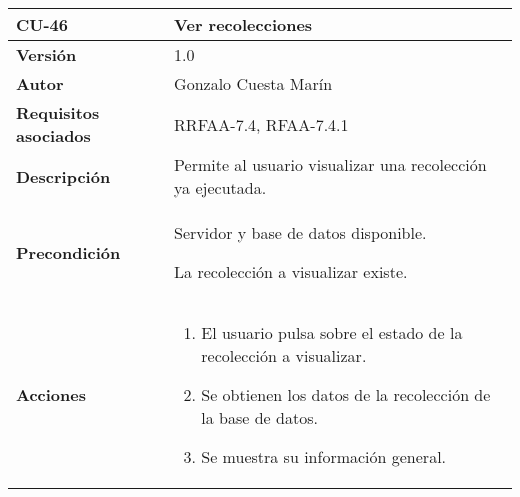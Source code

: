 \begin{longtable}[]{@{}ll@{}}
\toprule
\begin{minipage}[b]{0.25\columnwidth}\raggedright
\textbf{CU-46}\strut
\end{minipage} & \begin{minipage}[b]{0.69\columnwidth}\raggedright
\textbf{Ver recolecciones}\strut
\end{minipage}\tabularnewline
\midrule
\endhead
\begin{minipage}[t]{0.25\columnwidth}\raggedright
\textbf{Versión}\strut
\end{minipage} & \begin{minipage}[t]{0.69\columnwidth}\raggedright
1.0\strut
\end{minipage}\tabularnewline
\begin{minipage}[t]{0.25\columnwidth}\raggedright
\textbf{Autor}\strut
\end{minipage} & \begin{minipage}[t]{0.69\columnwidth}\raggedright
Gonzalo Cuesta Marín\strut
\end{minipage}\tabularnewline
\begin{minipage}[t]{0.25\columnwidth}\raggedright
\textbf{Requisitos asociados}\strut
\end{minipage} & \begin{minipage}[t]{0.69\columnwidth}\raggedright
RRFAA-7.4, RFAA-7.4.1\strut
\end{minipage}\tabularnewline
\begin{minipage}[t]{0.25\columnwidth}\raggedright
\textbf{Descripción}\strut
\end{minipage} & \begin{minipage}[t]{0.69\columnwidth}\raggedright
Permite al usuario visualizar una recolección ya ejecutada.\strut
\end{minipage}\tabularnewline
\begin{minipage}[t]{0.25\columnwidth}\raggedright
\textbf{Precondición}\strut
\end{minipage} & \begin{minipage}[t]{0.69\columnwidth}\raggedright
Servidor y base de datos disponible.

La recolección a visualizar existe.\strut
\end{minipage}\tabularnewline
\begin{minipage}[t]{0.25\columnwidth}\raggedright
\textbf{Acciones}\strut
\end{minipage} & \begin{minipage}[t]{0.69\columnwidth}\raggedright
\begin{enumerate}
\def\labelenumi{\arabic{enumi}.}
\tightlist
\item
  El usuario pulsa sobre el estado de la recolección a visualizar.
\item
  Se obtienen los datos de la recolección de la base de datos.
\item
  Se muestra su información general.


\end{enumerate}
\end{minipage}
\end{longtable}
